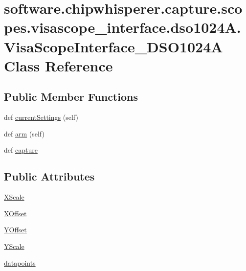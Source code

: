\hypertarget{classsoftware_1_1chipwhisperer_1_1capture_1_1scopes_1_1visascope__interface_1_1dso1024A_1_1VisaScopeInterface__DSO1024A}{}\section{software.\+chipwhisperer.\+capture.\+scopes.\+visascope\+\_\+interface.\+dso1024\+A.\+Visa\+Scope\+Interface\+\_\+\+D\+S\+O1024\+A Class Reference}
\label{classsoftware_1_1chipwhisperer_1_1capture_1_1scopes_1_1visascope__interface_1_1dso1024A_1_1VisaScopeInterface__DSO1024A}
\subsection*{Public Member Functions}
\begin{DoxyCompactItemize}
\item 
def \hyperlink{classsoftware_1_1chipwhisperer_1_1capture_1_1scopes_1_1visascope__interface_1_1dso1024A_1_1VisaScopeInterface__DSO1024A_ac27dda72f2f9a3b3ab001686da9b4438}{current\+Settings} (self)
\item 
def \hyperlink{classsoftware_1_1chipwhisperer_1_1capture_1_1scopes_1_1visascope__interface_1_1dso1024A_1_1VisaScopeInterface__DSO1024A_a075bdad3b84f5bd3c4b8acead240edd5}{arm} (self)
\item 
def \hyperlink{classsoftware_1_1chipwhisperer_1_1capture_1_1scopes_1_1visascope__interface_1_1dso1024A_1_1VisaScopeInterface__DSO1024A_a563083d31920510172e1c0798755a417}{capture}
\end{DoxyCompactItemize}
\subsection*{Public Attributes}
\begin{DoxyCompactItemize}
\item 
\hyperlink{classsoftware_1_1chipwhisperer_1_1capture_1_1scopes_1_1visascope__interface_1_1dso1024A_1_1VisaScopeInterface__DSO1024A_a6ebcba9936b398c3d10e29d57890afd7}{X\+Scale}
\item 
\hyperlink{classsoftware_1_1chipwhisperer_1_1capture_1_1scopes_1_1visascope__interface_1_1dso1024A_1_1VisaScopeInterface__DSO1024A_afe6d931718d6752110b987d9de5b1bfe}{X\+Offset}
\item 
\hyperlink{classsoftware_1_1chipwhisperer_1_1capture_1_1scopes_1_1visascope__interface_1_1dso1024A_1_1VisaScopeInterface__DSO1024A_af504e998f28897b41c441e8ce23d67f6}{Y\+Offset}
\item 
\hyperlink{classsoftware_1_1chipwhisperer_1_1capture_1_1scopes_1_1visascope__interface_1_1dso1024A_1_1VisaScopeInterface__DSO1024A_a8d6f74657af87a4fcb49c9f7d24c7d2a}{Y\+Scale}
\item 
\hyperlink{classsoftware_1_1chipwhisperer_1_1capture_1_1scopes_1_1visascope__interface_1_1dso1024A_1_1VisaScopeInterface__DSO1024A_aad93aa73a6b4ec5b97f570d7252dc293}{datapoints}
\end{DoxyCompactItemize}

